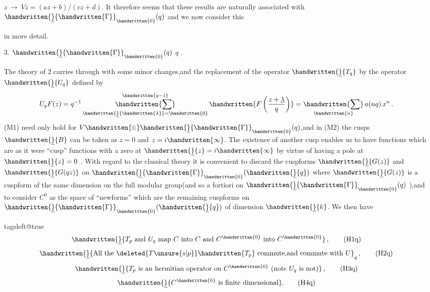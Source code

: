 $z\ \rightarrow\ Vz=(az+b)/(cz+d)$. It therefore seems that these results are naturally associated with $\handwritten{\underline}{\handwritten{\Gamma}}_{\handwritten{0}}(q)$ and we now consider this

in more detail.

3.   $\handwritten{\underline}{\handwritten{\Gamma}}_{\handwritten{0}}(q)$  $q$ .

The theory of \handwritten{\S}2 carries through with some minor changes,and the replacement of the operator $\handwritten{\underline}{T_q}$ by the operator $\handwritten{\underline}{U_q}$ defined by
\[
 U_q F(z)=q^{-1}\mathop{\handwritten{\sum}}\limits_{\handwritten{\underline}{\handwritten{\lambda}}=\handwritten{0}}^{\handwritten{q-1}} \handwritten{F\left(\frac{z+\underline{\lambda}}{q}\right)}=\mathop{\handwritten{\sum}}\limits_{\handwritten{n}}a(nq)\,x^n\,.
\]
(M1) need only hold for $V \handwritten{\in}\handwritten{\underline}{\handwritten{\Gamma}}_{\handwritten{0}}(q)$,and in (M2) the  cusps $\handwritten{\underline}{B}$ can be taken as $z=0$ and $z=i\handwritten{\infty}$. The existence of another cusp enables us to have functions which are as it were ``cusp'' functions with a zero at $\handwritten{\underline}{z}=i\handwritten{\infty}$ by virtue of having a pole at $\handwritten{\underline}{z}=0$ . With regard to the classical theory it is convenient to discard the cuspforms $\handwritten{\underline}{G(z)}$ and $\handwritten{\underline}{G(qz)}$ on $\handwritten{\underline}{\handwritten{\Gamma}}_{\handwritten{0}}(\handwritten{\underline}{q})$ where $\handwritten{\underline}{G(z)}$ is a cuspform of the same dimension on the full modular group(and so a fortiori on $\handwritten{\underline}{\handwritten{\Gamma}}_{\handwritten{0}}(q)$ ),and to consider $C^0$ as the space of ``newforms'' which are the remaining cuspforms on $\handwritten{\underline}{\handwritten{\Gamma}}_{\handwritten{0}}(\handwritten{\underline}{q})$ of dimension $\handwritten{\underline}{k}$. We then have

\begingroup\csname tagsleft@true\endcsname
\[
 \handwritten{\underline}{T_p\text{ and }U_q\text{ map }C\text{ into }C\text{ and }C^{\handwritten{0}}\text{ into }C^{\handwritten{0}}}\,, \tag*{(H1q)}
\]
\[
 \handwritten{\underline}{\text{All the } \deleted{T\unsure{s|p}}\handwritten{T_p}\text{ commute,and commute with }U}_{q}\,, \tag*{(H2q)}
\]
\[
 \handwritten{\underline}{T_p\text{ is an hermitian operator on }C^{\handwritten{0}}\text{ (note }U_q\text{ is not)}}\,, \tag*{(H3q)}
\]
\[
 \handwritten{\underline}{C^{\handwritten{0}}\text{ is finite dimensional}}. \tag*{(H4q)}
\]
\endgroup

